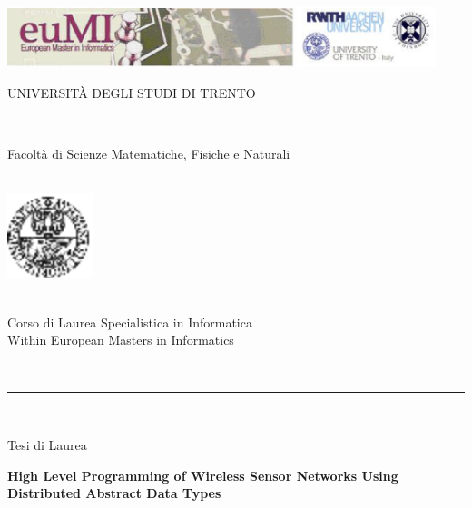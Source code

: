 \documentclass[msc, openright, a4paper]{TNthesis}
\author{Galiia Khasanova}
\begin{document}
 


\begin{preliminary}

\begin{titlepage}
	    \begin{center}
	    \vspace{-7.3cm}
	    \includegraphics[scale=.6,width=12.5cm]{img/logo_eumi.eps}\\
	
	 \vspace{0.3cm}
	        \begin{LARGE}
	        UNIVERSIT\`A DEGLI STUDI DI TRENTO
	        \end{LARGE}\\
	    \begin{large}
	        Facolt\`a di Scienze Matematiche, Fisiche e Naturali\\
	    \end{large}
	        \ \\
	    \vspace{0.5cm}
	    \includegraphics[width=2.5cm]{img/logo_unitn.eps}\\
	    \vspace{-0.3cm}
	    \begin{Large}
	        \ \\
	        Corso di Laurea Specialistica in Informatica\\
	        Within European Masters in Informatics
	        \end{Large}
	        \ \\
	        \hrule
	        \ \\
	        \begin{Large}
	        Tesi di Laurea\\
	        \end{Large}
	        \vspace{1.0cm}
	    \begin{center}
	    \begin{LARGE}
	        \textbf{High Level Programming of Wireless Sensor Networks Using Distributed Abstract Data Types}\\
	        \end{LARGE}
	    \end{center}
	

\end{center}
\end{titlepage}
\end{preliminary}
\end{document}
